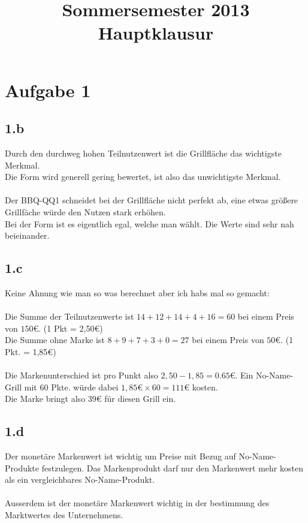 

\title{Sommersemester 2013 Hauptklausur}
\maketitle

\section*{Aufgabe 1}
\subsection*{1.b}
    Durch den durchweg hohen Teilnutzenwert ist die Grillfläche das wichtigste Merkmal. \\
    Die Form wird generell gering bewertet, ist also das unwichtigste Merkmal. \\
    \ \\
    Der BBQ-QQ1 schneidet bei der Grillfläche nicht perfekt ab, eine etwas größere Grillfäche würde den Nutzen stark erhöhen. \\
    Bei der Form ist es eigentlich egal, welche man wählt. Die Werte sind sehr nah beieinander.

\subsection*{1.c}
    Keine Ahnung wie man so was berechnet aber ich habs mal so gemacht: \\
    \ \\
    Die Summe der Teilnutzenwerte ist $14+12+14+4+16 = 60$ bei einem Preis von $150€$. (1 Pkt = 2,50€) \\
    Die Summe ohne Marke ist $8+9+7+3+0 = 27$ bei einem Preis von $50€$. (1 Pkt. = 1,85€) \\
    \ \\
    Die Markenunterschied ist pro Punkt also $2,50 - 1,85 = 0.65€$. Ein No-Name-Grill mit 60 Pkte. würde dabei $1,85€ \times 60 = 111€$ kosten. \\
    Die Marke bringt also 39€ für diesen Grill ein.

\subsection*{1.d}
    Der monetäre Markenwert ist wichtig um Preise mit Bezug auf No-Name-Produkte festzulegen.
    Das Markenprodukt darf nur den Markenwert mehr kosten als ein vergleichbares No-Name-Produkt. \\
    \ \\
    Ausserdem ist der monetäre Markenwert wichtig in der bestimmung des Marktwertes des Unternehmens.

